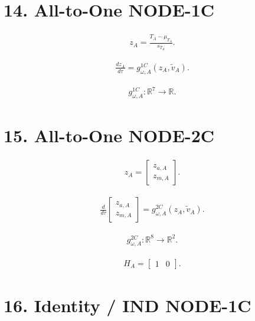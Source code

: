 \documentclass[11pt]{article}
\begin{document}
\section*{14. All-to-One NODE-1C}

\begin{align}
\boxed{
z_A=\frac{T_A-\mu_{T_A}}{s_{T_A}}.
}
\tag{N3.41}
\end{align}

\begin{align}
\boxed{
\frac{dz_A}{d\tau}
=
g_{\omega,A}^{1C}(z_A,\widetilde v_A).
}
\tag{N3.42}
\end{align}

\begin{align}
\boxed{
g_{\omega,A}^{1C}:\mathbb R^{7}\rightarrow\mathbb R.
}
\tag{N3.43}
\end{align}

\section*{15. All-to-One NODE-2C}

\begin{align}
\boxed{
z_A=
\begin{bmatrix}
z_{a,A}\\
z_{m,A}
\end{bmatrix}.
}
\tag{N3.44}
\end{align}

\begin{align}
\boxed{
\frac{d}{d\tau}
\begin{bmatrix}
z_{a,A}\\
z_{m,A}
\end{bmatrix}
=
g_{\omega,A}^{2C}(z_A,\widetilde v_A).
}
\tag{N3.45}
\end{align}

\begin{align}
\boxed{
g_{\omega,A}^{2C}:\mathbb R^{8}\rightarrow\mathbb R^2.
}
\tag{N3.46}
\end{align}

\begin{align}
\boxed{
H_A=
\begin{bmatrix}
1&0
\end{bmatrix}.
}
\tag{N3.47}
\end{align}

\section*{16. Identity / IND NODE-1C}
\end{document}
